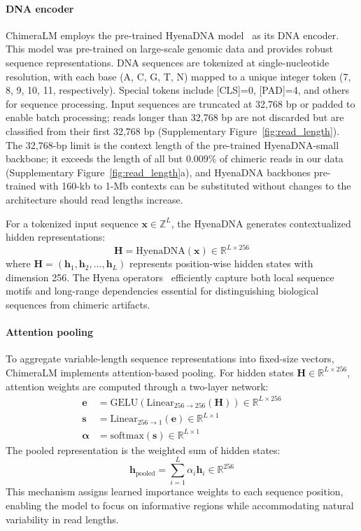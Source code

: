 \documentclass[pdflatex,lineno]{sn-jnl}%
\newif\ifrevisedtext
\newcommand{\chg}[1]{\ifrevisedtext\textcolor{revcolor}{#1}\else#1\fi}
\begin{document}
\paragraph{DNA encoder}
ChimeraLM employs the pre-trained HyenaDNA model~\cite{nguyen2023hyenadna} as its DNA encoder.
This model was pre-trained on large-scale genomic data and provides robust sequence representations.
DNA sequences are tokenized at single-nucleotide resolution, with each base (A, C, G, T, N) mapped to a unique integer token (7, 8, 9, 10, 11, respectively).
Special tokens include [CLS]=0, [PAD]=4, and others for sequence processing.
Input sequences are truncated at 32,768 bp or padded to enable batch processing\chg{; reads longer than 32,768 bp are not discarded but are classified from their first 32,768 bp (Supplementary Figure~\ref{fig:read_length})}.
\chg{The 32,768-bp limit is the context length of the pre-trained HyenaDNA-small backbone; it exceeds the length of all but 0.009\% of chimeric reads in our data (Supplementary Figure~\ref{fig:read_length}a), and HyenaDNA backbones pre-trained with 160-kb to 1-Mb contexts can be substituted without changes to the architecture should read lengths increase.}

For a tokenized input sequence $\mathbf{x} \in \mathbb{Z}^{L}$, the HyenaDNA generates contextualized hidden representations:
\[
	\mathbf{H} = \text{HyenaDNA}(\mathbf{x}) \in \mathbb{R}^{L \times 256}
\]
where $\mathbf{H} = (\mathbf{h}_1, \mathbf{h}_2, \ldots, \mathbf{h}_L)$ represents position-wise hidden states with dimension 256.
The Hyena operators~\cite{Poli2023HyenaHT} efficiently capture both local sequence motifs and long-range dependencies essential for distinguishing biological sequences from chimeric artifacts.

\paragraph{Attention pooling}
To aggregate variable-length sequence representations into fixed-size vectors, ChimeraLM implements attention-based pooling.
For hidden states $\mathbf{H} \in \mathbb{R}^{L \times 256}$, attention weights are computed through a two-layer network:
\begin{align*}
	\mathbf{e}          & = \text{GELU}(\text{Linear}_{256 \to 256}(\mathbf{H})) \in \mathbb{R}^{L \times 256} \\
	\mathbf{s}          & = \text{Linear}_{256 \to 1}(\mathbf{e}) \in \mathbb{R}^{L \times 1}                  \\
	\boldsymbol{\alpha} & = \text{softmax}(\mathbf{s}) \in \mathbb{R}^{L \times 1}
\end{align*}
The pooled representation is the weighted sum of hidden states:
\[
	\mathbf{h}_{\text{pooled}} = \sum_{i=1}^{L} \alpha_i \mathbf{h}_i \in \mathbb{R}^{256}
\]
This mechanism assigns learned importance weights to each sequence position, enabling the model to focus on informative regions while accommodating natural variability in read lengths.
\end{document}
